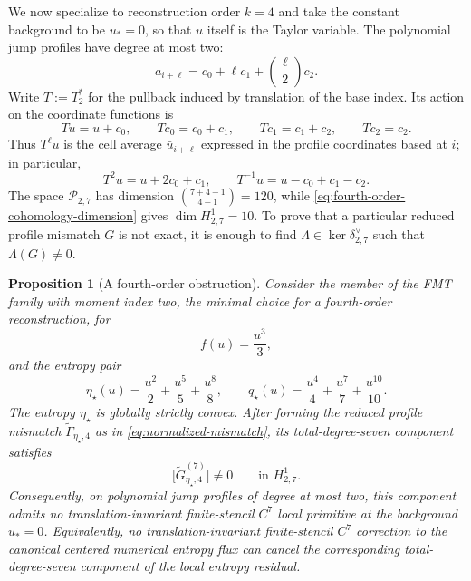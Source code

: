 \documentclass[11pt]{amsart}
\theoremstyle{plain}
\newtheorem{proposition}[theorem]{Proposition}
\theoremstyle{definition}
\theoremstyle{remark}
\numberwithin{equation}{section}
\theoremstyle{plain}
\begin{document}
We now specialize to reconstruction order $k=4$ and take the constant
background to be $u_*=0$, so that $u$ itself is the Taylor variable.  The
polynomial jump profiles have degree at most two:
\begin{equation}\label{eq:fourth-order-profile}
	a_{i+\ell}
	=c_0+\ell c_1+\binom{\ell}{2}c_2.
\end{equation}
Write $T:=T_2^*$ for the pullback induced by translation of the base index.
Its action on the coordinate functions is
\begin{equation}\label{eq:fourth-order-shift}
	Tu=u+c_0,
	\qquad
	Tc_0=c_0+c_1,
	\qquad
	Tc_1=c_1+c_2,
	\qquad
	Tc_2=c_2.
\end{equation}
Thus $T^\ell u$ is the cell average $\bar u_{i+\ell}$ expressed in the
profile coordinates based at $i$; in particular,
\begin{equation}\label{eq:fourth-order-shifted-base-values}
	T^2u=u+2c_0+c_1,
	\qquad
	T^{-1}u=u-c_0+c_1-c_2.
\end{equation}
The space $\mathscr P_{2,7}$ has dimension
$\binom{7+4-1}{4-1}=120$, while
\eqref{eq:fourth-order-cohomology-dimension} gives
$\dim H^1_{2,7}=10$.
To prove that a particular reduced profile mismatch $G$ is not exact, it
is enough to find $\Lambda\in\ker\delta_{2,7}^{\vee}$ such that
$\Lambda(G)\ne0$.

\begin{proposition}[A fourth-order obstruction]
	\label{prop:fourth-order-obstruction}
	Consider the member of the FMT family with moment index two, the minimal
	choice for a fourth-order reconstruction, for
	\[
	f(u)=\frac{u^3}{3},
	\]
	and the entropy pair
	\begin{equation}\label{eq:fourth-order-entropy-pair}
		\eta_\star(u)
		=\frac{u^2}{2}+\frac{u^5}{5}+\frac{u^8}{8},
		\qquad
		q_\star(u)
		=\frac{u^4}{4}+\frac{u^7}{7}+\frac{u^{10}}{10}.
	\end{equation}
	The entropy $\eta_\star$ is globally strictly convex.
	After forming the reduced profile mismatch
	$\widetilde\Gamma_{\eta_\star,4}$ as in
	\eqref{eq:normalized-mismatch}, its total-degree-seven component satisfies
	\begin{equation}\label{eq:fourth-order-nonzero-class}
		\bigl[\widetilde G_{\eta_\star,4}^{(7)}\bigr]
		\ne0
		\qquad\text{in }H^1_{2,7}.
	\end{equation}
	Consequently, on polynomial jump profiles of degree at most two, this
	component admits no translation-invariant finite-stencil $C^7$ local
	primitive at the background $u_*=0$.
	Equivalently, no translation-invariant finite-stencil
	$C^7$ correction to the canonical centered numerical entropy flux can
	cancel the corresponding total-degree-seven component of the local
	entropy residual.
\end{proposition}
\end{document}
